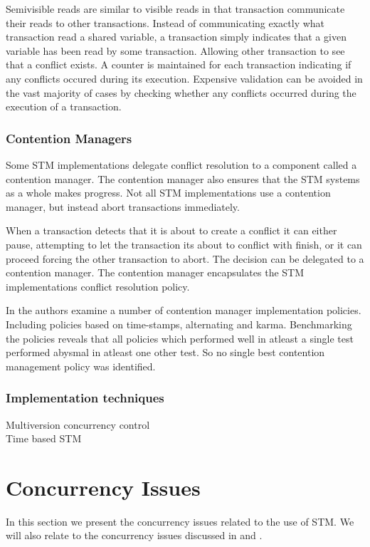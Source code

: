 Semivisible reads are similar to visible reads in that transaction communicate their reads to other transactions. Instead of communicating exactly what transaction read a shared variable, a transaction simply indicates that a given variable has been read by some transaction. Allowing other transaction to see that a conflict exists. A counter is maintained for each transaction indicating if any conflicts occured during its execution. Expensive validation can be avoided in the vast majority of cases by checking whether any conflicts occurred during the execution of a transaction\cite[p. 2]{lev2009anatomy}.

\subsubsection{Contention Managers}
Some \ac{STM} implementations delegate conflict resolution to a component called a contention manager\cite[p. 2085]{herlihy2011tm}. The contention manager also ensures that the \ac{STM} systems as a whole makes progress\cite[p. 1]{guerraoui2005toward}. Not all \ac{STM} implementations use a contention manager, but instead abort transactions immediately\cite[38]{riegel2013software}.

When a transaction detects that it is about to create a conflict it can either pause, attempting to let the transaction its about to conflict with finish, or it can proceed forcing the other transaction to abort. The decision can be delegated to a contention manager. The contention manager encapsulates the \ac{STM} implementations conflict resolution policy\cite[p. 2085]{herlihy2011tm}.

In \cite{scherer2004contention} the authors examine a number of contention manager implementation policies. Including policies based on time-stamps, alternating and karma. Benchmarking the policies reveals that all policies which performed well in atleast a single test performed abysmal in atleast one other test. So no single best contention management policy was identified.
\subsubsection{Implementation techniques}
Multiversion concurrency control\\
Time based STM\\


\section{Concurrency Issues}
In this section we present the concurrency issues related to the use of \ac{STM}. We will also relate to the concurrency issues discussed in  and .
\label{sec:stm_issues}

